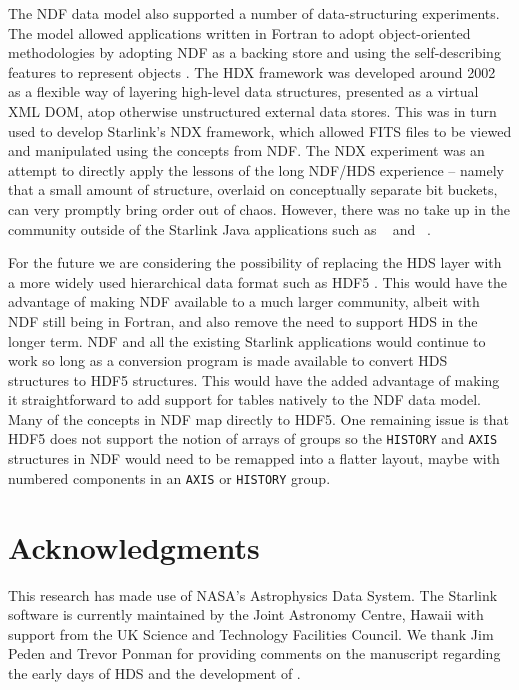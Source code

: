 \documentclass[final,authoryear,5p,times,twocolumn]{elsarticle}
\begin{document}
The NDF data model also supported a number of data-structuring
experiments.
The model allowed applications written in Fortran to
adopt object-oriented methodologies by adopting NDF as a backing store
and using the self-describing features to represent objects
\citep{1993ASPC...52..199B}.
The HDX framework \citep{2003ASPC..295..221G} was developed around 2002 as a flexible
way of layering high-level data structures, presented as a virtual XML
DOM, atop otherwise unstructured external data stores.  This was in
turn used to develop Starlink's NDX framework,\label{sec:ndx} which allowed FITS
files to be viewed and manipulated using the concepts from NDF.
The NDX experiment was an attempt to directly apply the
lessons of the long NDF/HDS experience -- namely that a small amount of
structure, overlaid on conceptually separate bit buckets, can very
promptly bring order out of chaos.
However, there was no take up in the community outside of the Starlink Java applications
such as \treeview\ \citep{2003ASPC..295..445B} and
\splat\ \citep[][]{2005ASPC..347...22D,2014Skoda}.

For the future we are considering the possibility of replacing the HDS
layer with a more widely used hierarchical data format such as HDF5
\citep{Folk:2011:OHT:1966895.1966900}. This would have the advantage
of making NDF available to a much larger community, albeit with NDF
still being in Fortran, and also remove the
need to support HDS in the longer term. NDF and all the existing
Starlink applications would continue to work so long as a conversion
program is made available to convert HDS structures to HDF5 structures.
This would have the added advantage of making it straightforward to
add support for tables natively to the NDF data model. Many of the
concepts in NDF map directly to HDF5. One remaining issue is that HDF5
does not support the notion of arrays of groups so the
\texttt{HISTORY} and \texttt{AXIS} structures in NDF would need to be
remapped into a flatter layout, maybe with numbered components in an
\texttt{AXIS} or \texttt{HISTORY} group.

\section{Acknowledgments}

This research has made use of NASA's Astrophysics Data System.
The Starlink software is currently maintained by the Joint Astronomy
Centre, Hawaii with support from the UK Science and Technology
Facilities Council. We thank Jim Peden and Trevor Ponman for providing
comments on the manuscript regarding the early days of HDS and the
development of \asterix.
\end{document}
